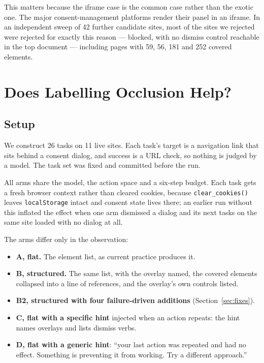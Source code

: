\documentclass[conference]{IEEEtran}
\begin{document}
This matters because the iframe case is the common case rather than the exotic
one. The major consent-management platforms render their panel in an iframe. In
an independent sweep of 42 further candidate sites, most of the sites we
rejected were rejected for exactly this reason --- blocked, with no dismiss
control reachable in the top document --- including pages with 59, 56, 181 and
252 covered elements.

\section{Does Labelling Occlusion Help?}
\label{sec:ablation}

\subsection{Setup}

We construct 26 tasks on 11 live sites. Each task's target is a navigation link
that sits behind a consent dialog, and success is a URL check, so nothing is
judged by a model. The task set was fixed and committed before the run.

All arms share the model, the action space and a six-step budget. Each task
gets a fresh browser context rather than cleared cookies, because
\texttt{clear\_cookies()} leaves \texttt{localStorage} intact and consent state
lives there; an earlier run without this inflated the effect when one arm
dismissed a dialog and its next tasks on the same site loaded with no dialog at
all.

The arms differ only in the observation:

\begin{itemize}
\item \textbf{A, flat.} The element list, as current practice produces it.
\item \textbf{B, structured.} The same list, with the overlay named, the
covered elements collapsed into a line of references, and the overlay's own
controls listed.
\item \textbf{B2, structured with four failure-driven additions}
(Section~\ref{sec:fixes}).
\item \textbf{C, flat with a specific hint} injected when an action repeats:
the hint names overlays and lists dismiss verbs.
\item \textbf{D, flat with a generic hint}: ``your last action was repeated and
had no effect. Something is preventing it from working. Try a different
approach.''
\end{itemize}
\end{document}
